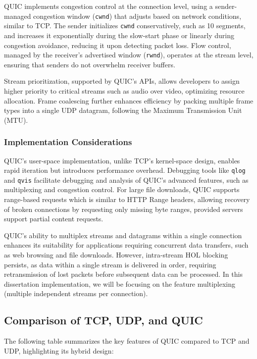 QUIC implements congestion control at the connection level, using a sender-managed congestion window (\texttt{cwnd}) that adjusts based on network conditions, similar to TCP. The sender initializes \texttt{cwnd} conservatively, such as 10 segments, and increases it exponentially during the slow-start phase or linearly during congestion avoidance, reducing it upon detecting packet loss. Flow control, managed by the receiver’s advertised window (\texttt{rwnd}), operates at the stream level, ensuring that senders do not overwhelm receiver buffers.

Stream prioritization, supported by QUIC’s APIs, allows developers to assign higher priority to critical streams such as audio over video, optimizing resource allocation. Frame coalescing further enhances efficiency by packing multiple frame types into a single UDP datagram, following the Maximum Transmission Unit (MTU).

\subsubsection{Implementation Considerations}

QUIC’s user-space implementation, unlike TCP’s kernel-space design, enables rapid iteration but introduces performance overhead. Debugging tools like \texttt{qlog} and \texttt{qvis} facilitate debugging and analysis of QUIC’s advanced features, such as multiplexing and congestion control. For large file downloads, QUIC supports range-based requests which is similar to HTTP Range headers, allowing recovery of broken connections by requesting only missing byte ranges, provided servers support partial content requests.

QUIC’s ability to multiplex streams and datagrams within a single connection enhances its suitability for applications requiring concurrent data transfers, such as web browsing and file downloads. However, intra-stream HOL blocking persists, as data within a single stream is delivered in order, requiring retransmission of lost packets before subsequent data can be processed. In this dissertation implementation, we will be focusing on the feature multiplexing (multiple independent streams per connection).

\subsection{Comparison of TCP, UDP, and QUIC}

The following table summarizes the key features of QUIC compared to TCP and UDP, highlighting its hybrid design:

